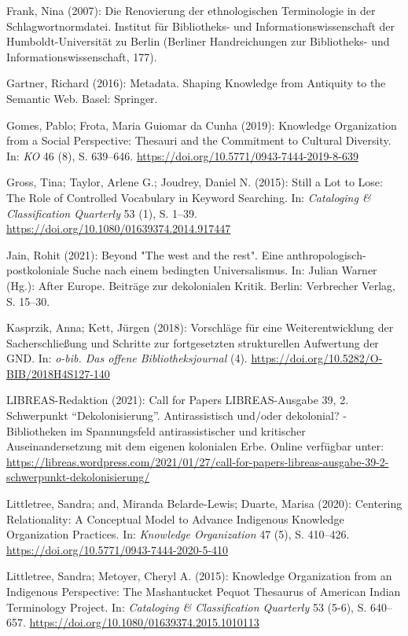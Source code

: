 \documentclass[a4paper,
fontsize=11pt,
oneside,
numbers=noperiodatend,
parskip=half-,
bibliography=totoc,
final
]{scrartcl}
\begin{document}
Frank, Nina (2007): Die Renovierung der ethnologischen Terminologie in
der Schlagwortnormdatei. Institut für Bibliotheks- und
Informationswissenschaft der Humboldt-Universität zu Berlin (Berliner
Handreichungen zur Bibliotheks- und Informationswissenschaft, 177).

Gartner, Richard (2016): Metadata. Shaping Knowledge from Antiquity to
the Semantic Web. Basel: Springer.

Gomes, Pablo; Frota, Maria Guiomar da Cunha (2019): Knowledge
Organization from a Social Perspective: Thesauri and the Commitment to
Cultural Diversity. In: \emph{KO} 46 (8), S. 639--646.
\url{https://doi.org/10.5771/0943-7444-2019-8-639}

Gross, Tina; Taylor, Arlene G.; Joudrey, Daniel N. (2015): Still a Lot
to Lose: The Role of Controlled Vocabulary in Keyword Searching. In:
\emph{Cataloging \& Classification Quarterly} 53 (1), S. 1--39.
\url{https://doi.org/10.1080/01639374.2014.917447}

Jain, Rohit (2021): Beyond "The west and the rest". Eine
anthropologisch-postkoloniale Suche nach einem bedingten Universalismus.
In: Julian Warner (Hg.): After Europe. Beiträge zur dekolonialen Kritik.
Berlin: Verbrecher Verlag, S. 15--30.

Kasprzik, Anna; Kett, Jürgen (2018): Vorschläge für eine
Weiterentwicklung der Sacherschließung und Schritte zur fortgesetzten
strukturellen Aufwertung der GND. In: \emph{o-bib. Das offene
Bibliotheksjournal} (4).
\url{https://doi.org/10.5282/O-BIB/2018H4S127-140}

LIBREAS-Redaktion (2021): Call for Papers LIBREAS-Ausgabe 39, 2.
Schwerpunkt \enquote{Dekolonisierung}. Antirassistisch und/oder
dekolonial? - Bibliotheken im Spannungsfeld antirassistischer und
kritischer Auseinandersetzung mit dem eigenen kolonialen Erbe. Online
verfügbar unter:
\href{https://libreas.wordpress.com/2021/01/27/call-for-papers-libreas-ausgabe-39-2-schwerpunkt-dekolonisierung/}{https://libreas.wordpress.com/2021/01/27/call-for-papers-libreas-ausgabe-39-2-\linebreak schwerpunkt-dekolonisierung/}

Littletree, Sandra; and, Miranda Belarde-Lewis; Duarte, Marisa (2020):
Centering Relationality: A Conceptual Model to Advance Indigenous
Knowledge Organization Practices. In: \emph{Knowledge Organization} 47
(5), S. 410--426. \url{https://doi.org/10.5771/0943-7444-2020-5-410}

Littletree, Sandra; Metoyer, Cheryl A. (2015): Knowledge Organization
from an Indigenous Perspective: The Mashantucket Pequot Thesaurus of
American Indian Terminology Project. In: \emph{Cataloging \&
Classification Quarterly} 53 (5-6), S. 640--657.
\url{https://doi.org/10.1080/01639374.2015.1010113}
\end{document}
